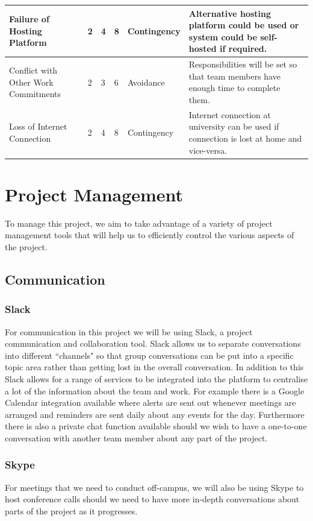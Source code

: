 \documentclass{article}
\begin{document}
\begin{landscape}
\begin{table}[ht]
\begin{tabularx}{\linewidth}{|X|X|X|X|X|X|}
    Failure of Hosting Platform & 2 & 4 & 8 & Contingency & Alternative hosting platform could be used or system could be self-hosted if required. \\ \hline
    Conflict with Other Work Commitments & 2 & 3 & 6 & Avoidance & Responsibilities will be set so that team members have enough time to complete them. \\ \hline
    Loss of Internet Connection & 2 & 4 & 8 & Contingency & Internet connection at university can be used if connection is lost at home and vice-versa. \\ \hline
    \end{tabularx}
\end{table}
\end{landscape}
\newpage

\section{Project Management}
\label{projectmanagementref}

To manage this project, we aim to take advantage of a variety of project management tools that will help us to efficiently control the various aspects of the project. 
\subsection{Communication}
\subsubsection{Slack}
For communication in this project we will be using Slack, a project communication and collaboration tool. Slack allows us to separate conversations into different ``channels" so that group conversations can be put into a specific topic area rather than getting lost in the overall conversation. In addition to this Slack allows for a range of services to be integrated into the platform to centralise a lot of the information about the team and work. For example there is a Google Calendar integration available where alerts are sent out whenever meetings are arranged and reminders are sent daily about any events for the day. Furthermore there is also a private chat function available should we wish to have a one-to-one conversation with another team member about any part of the project.
\subsubsection{Skype}
For meetings that we need to conduct off-campus, we will also be using Skype to host conference calls should we need to have more in-depth conversations about parts of the project as it progresses.
\end{document}
